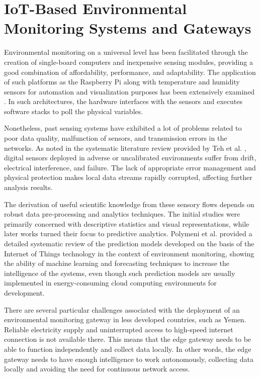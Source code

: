 \section{IoT-Based Environmental Monitoring Systems and Gateways}
Environmental monitoring on a universal level has been facilitated through the creation of single-board computers and inexpensive sensing modules, providing a good combination of affordability, performance, and adaptability. The application of such platforms as the Raspberry Pi along with temperature and humidity sensors for automation and visualization purposes has been extensively examined \cite{ref2, ref22, ref42}. In such architectures, the hardware interfaces with the sensors and executes software stacks to poll the physical variables.

Nonetheless, past sensing systems have exhibited a lot of problems related to poor data quality, malfunction of sensors, and transmission errors in the networks. As noted in the systematic literature review provided by Teh et al. \cite{ref3, ref23, ref43}, digital sensors deployed in adverse or uncalibrated environments suffer from drift, electrical interference, and failure. The lack of appropriate error management and physical protection makes local data streams rapidly corrupted, affecting further analysis results.

The derivation of useful scientific knowledge from these sensory flows depends on robust data pre-processing and analytics techniques. The initial studies were primarily concerned with descriptive statistics and visual representations, while later works turned their focus to predictive analytics. Polymeni et al. \cite{ref1, ref21, ref41} provided a detailed systematic review of the prediction models developed on the basis of the Internet of Things technology in the context of environment monitoring, showing the ability of machine learning and forecasting techniques to increase the intelligence of the systems, even though such prediction models are usually implemented in energy-consuming cloud computing environments for development.

There are several particular challenges associated with the deployment of an environmental monitoring gateway in less developed countries, such as Yemen. Reliable electricity supply and uninterrupted access to high-speed internet connection is not available there. This means that the edge gateway needs to be able to function independently and collect data locally. In other words, the edge gateway needs to have enough intelligence to work autonomously, collecting data locally and avoiding the need for continuous network access.

